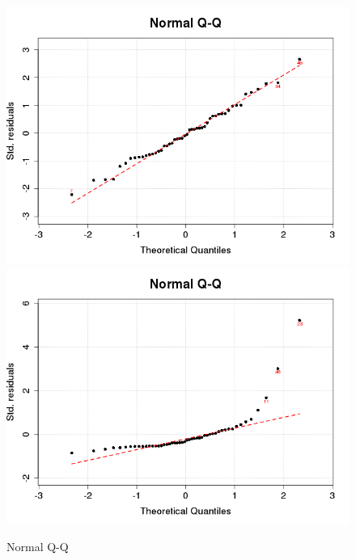\begin{figure}[p]
\begin{center}
    \includegraphics[scale=0.4]{imgOT/model1-drawQQplot.png}\hspace*{1cm}
	\includegraphics[scale=0.4]{imgOT/model2-drawQQplot.png}\\
  \end{center}
  \caption{Normal Q-Q}
\end{figure}

